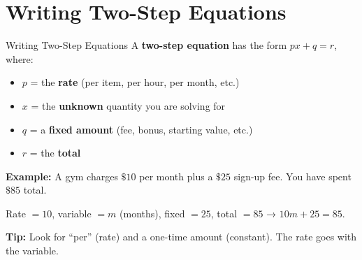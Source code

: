 \section{Writing Two-Step Equations}

\begin{quickReview}{Writing Two-Step Equations}
A \textbf{two-step equation} has the form $px + q = r$, where:
\begin{itemize}[leftmargin=*]
    \item $p$ = the \textbf{rate} (per item, per hour, per month, etc.)
    \item $x$ = the \textbf{unknown} quantity you are solving for
    \item $q$ = a \textbf{fixed amount} (fee, bonus, starting value, etc.)
    \item $r$ = the \textbf{total}
\end{itemize}

\medskip
\textbf{Example:} A gym charges $\$10$ per month plus a $\$25$ sign-up fee. You have spent $\$85$ total.

Rate $= 10$, variable $= m$ (months), fixed $= 25$, total $= 85$ → $10m + 25 = 85$.

\smallskip
\textbf{Tip:} Look for ``per'' (rate) and a one-time amount (constant). The rate goes with the variable.
\end{quickReview}


